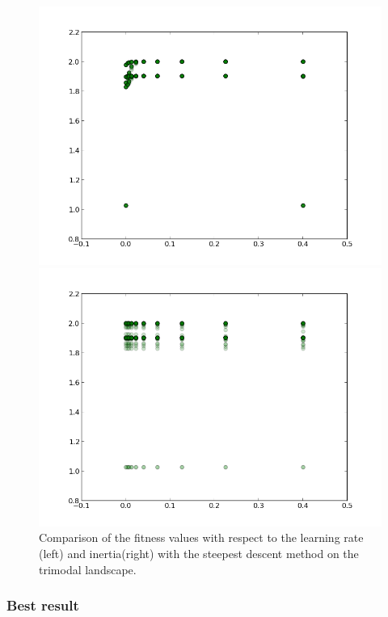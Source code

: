 \documentclass{scrartcl}
\begin{document}
\begin{figure}[H]
\centering
\begin{minipage}{.5\textwidth}
  \centering
  \includegraphics[width=.8\linewidth]{img/ex1/learning_trimodal_ss.png}
\end{minipage}%
\begin{minipage}{.5\textwidth}
  \centering
  \includegraphics[width=.8\linewidth]{img/ex1/inertia_trimodal_ss.png}
\end{minipage}
\caption{Comparison of the fitness values with respect to the learning rate (left) and inertia(right) with the steepest descent method on the trimodal landscape.}
\label{fig:}
\end{figure}

\subsubsection{Best result}
\end{document}
